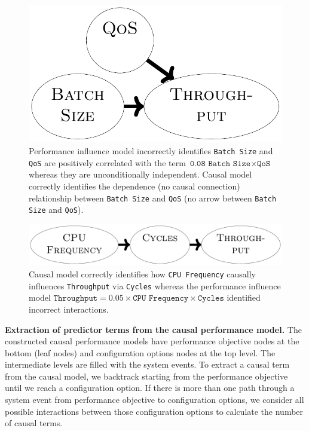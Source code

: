 \begin{figure}[h]
\small
    \centering
    \includegraphics*[width=0.5\linewidth]{figures-vg/spurious_two.pdf}
    \caption{\small {Performance influence model incorrectly identifies \texttt{Batch Size} and \texttt{QoS} are positively correlated with the term $\texttt{0.08 Batch Size} \times \texttt{QoS}$ whereas they are unconditionally independent. Causal model correctly identifies the dependence (no causal connection) relationship between \texttt{Batch Size} and \texttt{QoS} (no arrow between \texttt{Batch Size} and \texttt{QoS})}.}
    \label{fig:spurious_two}
    
\end{figure}
\begin{figure}[h]
\small
    \centering
    \includegraphics*[width=0.7\linewidth]{figures-vg/spurious_three.pdf}
    \caption{\small {Causal model correctly identifies how \texttt{CPU Frequency} causally influences \texttt{Throughput} via \texttt{Cycles} whereas the performance influence model $\texttt{Throughput} = 0.05 \times \texttt{CPU Frequency} \times \texttt{Cycles}$ identified incorrect interactions. }}
    \label{fig:spurious_three}
    
\end{figure}





\noindent \textbf{Extraction of predictor terms from the causal performance model.} The constructed causal performance models have performance objective nodes at the bottom (leaf nodes) and configuration options nodes at the top level. The intermediate levels are filled with the system events. To extract a causal term from the causal model, we backtrack starting from the performance objective until we reach a configuration option. If there is more than one path through a system event from performance objective to configuration options, we consider all possible interactions between those configuration options to calculate the number of causal terms.



